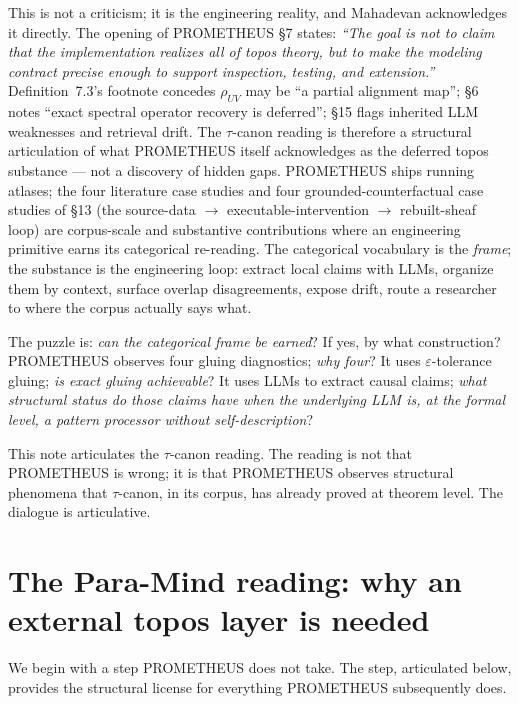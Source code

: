 \documentclass{pantarhei-researchnote}
\begin{document}
This is not a criticism; it is the engineering reality, and
Mahadevan acknowledges it directly. The opening of PROMETHEUS §7
states: \emph{``The goal is not to claim that the implementation
realizes all of topos theory, but to make the modeling contract
precise enough to support inspection, testing, and extension.''}
Definition~7.3's footnote concedes $\rho_{UV}$ may be ``a partial
alignment map''; §6 notes ``exact spectral operator recovery is
deferred''; §15 flags inherited LLM weaknesses and retrieval drift.
The $\tau$-canon reading is therefore a structural articulation of
what PROMETHEUS itself acknowledges as the deferred topos
substance --- not a discovery of hidden gaps. PROMETHEUS ships
running atlases; the four literature case studies and four
grounded-counterfactual case studies of §13 (the source-data
$\to$ executable-intervention $\to$ rebuilt-sheaf loop) are
corpus-scale and substantive contributions where an engineering
primitive earns its categorical re-reading. The categorical
vocabulary is the \emph{frame}; the substance is the engineering
loop: extract local claims with LLMs, organize them by context,
surface overlap disagreements, expose drift, route a researcher to
where the corpus actually says what.

The puzzle is: \emph{can the categorical frame be earned}? If yes,
by what construction? PROMETHEUS observes four gluing diagnostics;
\emph{why four}? It uses $\varepsilon$-tolerance gluing; \emph{is
exact gluing achievable}? It uses LLMs to extract causal claims;
\emph{what structural status do those claims have when the
underlying LLM is, at the formal level, a pattern processor without
self-description}?

This note articulates the $\tau$-canon reading. The reading is not
that PROMETHEUS is wrong; it is that PROMETHEUS observes structural
phenomena that $\tau$-canon, in its corpus, has already proved at
theorem level. The dialogue is articulative.

\section{The Para-Mind reading: why an external topos layer is needed}
\label{sec:paramind}

We begin with a step PROMETHEUS does not take. The step,
articulated below, provides the structural license for everything
PROMETHEUS subsequently does.
\end{document}
